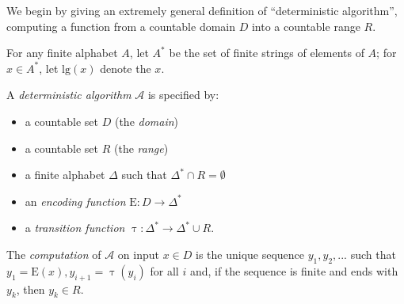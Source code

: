 \documentclass{scrartcl}
\begin{document}
We begin by giving an extremely general definition of ``deterministic algorithm'', computing a function from a countable domain \(D\) into a countable range
\(R\).

For any finite alphabet \(A\), let \(A^{*}\) be the set of finite strings of elements of \(A\); for \(x \in A^{*}\), let \(\mathrm{lg}(x)\) denote the \(x\).

A \emph{deterministic algorithm} \(\mathcal{A}\) is specified by:

\begin{itemize}
    \item[] a countable set \(D\) (the \emph{domain})
    \item[] a countable set \(R\) (the \emph{range})
    \item[] a finite alphabet \(\Delta\) such that \(\Delta^{*} \cap R = \emptyset\)
    \item[] an \emph{encoding function} \(\mathrm{E} \colon D \to \Delta^{*}\)
    \item[] a \emph{transition function} \(\uptau \colon \Delta^{*} \to \Delta^{*} \cup R\).
\end{itemize}

The \emph{computation} of \(\mathcal{A}\) on input \(x \in D\) is the unique sequence \(y_{1}, y_{2}, ...\) such that \(y_{1} = \mathrm{E}(x), y_{i + 1} =
\uptau(y_{i})\) for all \(i\) and, if the sequence is finite and ends with \(y_{k}\), then \(y_{k} \in R\).
\end{document}

